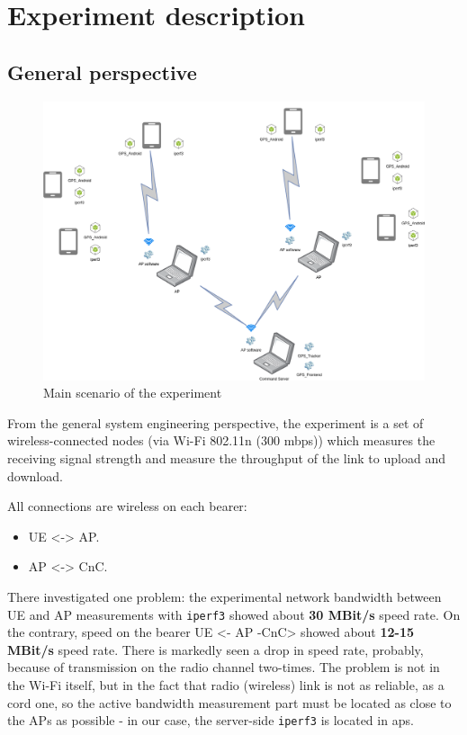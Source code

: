 \hypertarget{experiment-description}{%
\section{Experiment description}\label{experiment-description}}

\hypertarget{general-perspective}{%
\subsection{General perspective}\label{general-perspective}}

\begin{figure}[H]
\centering
\includegraphics[width=\linewidth,keepaspectratio]{images/Deployment Diagram-Free-structure_scheme.png}
\caption{Main scenario of the experiment}
\label{fig:experiment-overall-layout}
\end{figure}

From the general system engineering perspective, the experiment is a set
of wireless-connected nodes (via Wi-Fi 802.11n (300 mbps)) which measures the receiving signal strength and measure the throughput of the link to upload and download.

All connections are wireless on each bearer:

\begin{itemize}
\tightlist
\item
  UE \textless{}-\textgreater{} AP.
\item
  AP \textless{}-\textgreater{} CnC.
\end{itemize}

There investigated one problem: the experimental network bandwidth
between UE and AP measurements with \texttt{iperf3} showed about
\textbf{30 MBit/s} speed rate. On the contrary, speed on the bearer UE \textless{}- AP -CnC\textgreater{} showed about \textbf{12-15 MBit/s} speed rate. There is markedly seen a drop in speed rate, probably, because of transmission on the radio channel two-times. The problem  is not in the Wi-Fi itself, but in the fact that radio (wireless) link is not as reliable, as a cord one, so the active bandwidth measurement part must be located as close to the APs as possible - in our case, the server-side \texttt{iperf3} is located in \acrshort{ap}s.

